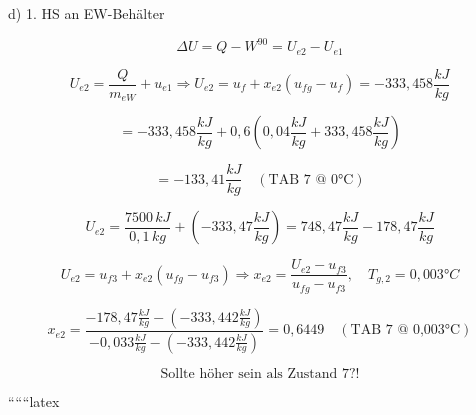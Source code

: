 d) 1. HS an EW-Behälter

\[
\Delta U = Q - W^{90} = U_{e2} - U_{e1}
\]

\[
U_{e2} = \frac{Q}{m_{eW}} + u_{e1} \Rightarrow U_{e2} = u_{f} + x_{e2} (u_{fg} - u_{f}) = -333,458 \frac{kJ}{kg}
\]

\[
= -333,458 \frac{kJ}{kg} + 0,6 (0,04 \frac{kJ}{kg} + 333,458 \frac{kJ}{kg})
\]

\[
= -133,41 \frac{kJ}{kg} \quad (\text{TAB 7 @ 0°C})
\]

\[
U_{e2} = \frac{7500 \, kJ}{0,1 \, kg} + (-333,47 \frac{kJ}{kg}) = 748,47 \frac{kJ}{kg} - 178,47 \frac{kJ}{kg}
\]

\[
U_{e2} = u_{f3} + x_{e2} (u_{fg} - u_{f3}) \Rightarrow x_{e2} = \frac{U_{e2} - u_{f3}}{u_{fg} - u_{f3}}, \quad T_{g,2} = 0,003°C
\]

\[
x_{e2} = \frac{-178,47 \frac{kJ}{kg} - (-333,442 \frac{kJ}{kg})}{-0,033 \frac{kJ}{kg} - (-333,442 \frac{kJ}{kg})} = 0,6449 \quad (\text{TAB 7 @ 0,003°C})
\]

\[
\text{Sollte höher sein als Zustand 7?!}
\]

``````latex